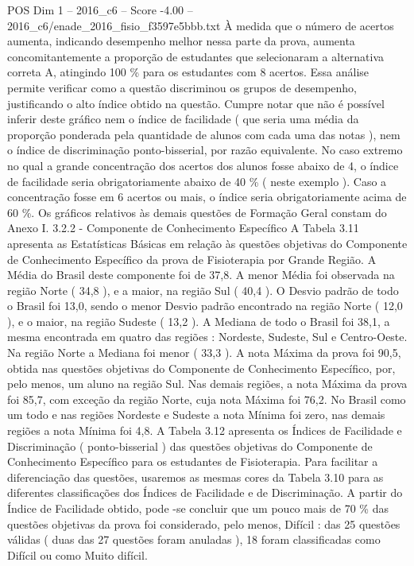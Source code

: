 \begin{textsample}{POS Dim 1 – 2016\_c6 – Score -4.00 – 2016\_c6/enade\_2016\_fisio\_f3597e5bbb.txt}
À medida que o número de acertos aumenta, indicando desempenho melhor nessa parte da prova, aumenta concomitantemente a proporção de estudantes que selecionaram a alternativa correta A, atingindo 100 \% para os estudantes com 8 acertos.
Essa análise permite verificar como a questão discriminou os grupos de desempenho, justificando o alto índice obtido na questão.
Cumpre notar que não é possível inferir deste gráfico nem o índice de facilidade ( que seria uma média da proporção ponderada pela quantidade de alunos com cada uma das notas ), nem o índice de discriminação ponto-bisserial, por razão equivalente.
No caso extremo no qual a grande concentração dos acertos dos alunos fosse abaixo de 4, o índice de facilidade seria obrigatoriamente abaixo de 40 \% ( neste exemplo ).
Caso a concentração fosse em 6 acertos ou mais, o índice seria obrigatoriamente acima de 60 \%.
Os gráficos relativos às demais questões de Formação Geral constam do Anexo I. 3.2.2 - Componente de Conhecimento Específico A Tabela 3.11 apresenta as Estatísticas Básicas em relação às questões objetivas do Componente de Conhecimento Específico da prova de Fisioterapia por Grande Região.
A Média do Brasil deste componente foi de 37,8.
A menor Média foi observada na região Norte ( 34,8 ), e a maior, na região Sul ( 40,4 ).
O Desvio padrão de todo o Brasil foi 13,0, sendo o menor Desvio padrão encontrado na região Norte ( 12,0 ), e o maior, na região Sudeste ( 13,2 ).
A Mediana de todo o Brasil foi 38,1, a mesma encontrada em quatro das regiões : Nordeste, Sudeste, Sul e Centro-Oeste.
Na região Norte a Mediana foi menor ( 33,3 ).
A nota Máxima da prova foi 90,5, obtida nas questões objetivas do Componente de Conhecimento Específico, por, pelo menos, um aluno na região Sul.
Nas demais regiões, a nota Máxima da prova foi 85,7, com exceção da região Norte, cuja nota Máxima foi 76,2.
No Brasil como um todo e nas regiões Nordeste e Sudeste a nota Mínima foi zero, nas demais regiões a nota Mínima foi 4,8.
A Tabela 3.12 apresenta os Índices de Facilidade e Discriminação ( ponto-bisserial ) das questões objetivas do Componente de Conhecimento Específico para os estudantes de Fisioterapia.
Para facilitar a diferenciação das questões, usaremos as mesmas cores da Tabela 3.10 para as diferentes classificações dos Índices de Facilidade e de Discriminação.
A partir do Índice de Facilidade obtido, pode -se concluir que um pouco mais de 70 \% das questões objetivas da prova foi considerado, pelo menos, Difícil : das 25 questões válidas ( duas das 27 questões foram anuladas ), 18 foram classificadas como Difícil ou como Muito difícil.

\end{textsample}
